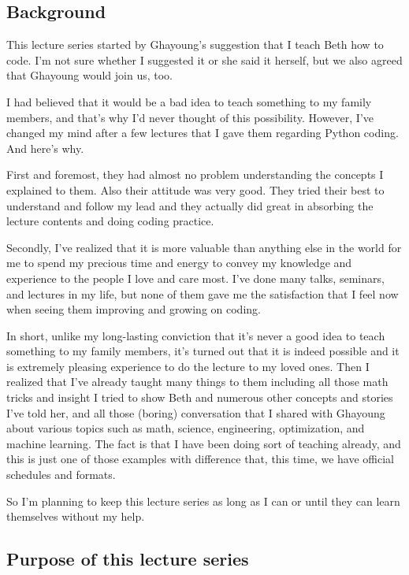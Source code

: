 \documentclass{article}
\begin{document}
\subsection{Background}

This lecture series started by Ghayoung's suggestion that I teach Beth how to code.
I'm not sure whether I suggested it or she said it herself, 
but we also agreed that Ghayoung would join us, too.

I had believed that it would be a bad idea to teach something to my family members,
and that's why I'd never thought of this possibility.
However, I've changed my mind after a few lectures that I gave them regarding Python coding.
And here's why.

First and foremost, they had almost no problem understanding the concepts I explained to them.
Also their attitude was very good. They tried their best to understand and follow my lead
and they actually did great in absorbing the lecture contents and doing coding practice.

Secondly, I've realized that it is more valuable than anything else in the world for me to
spend my precious time and energy to convey my knowledge and experience to the people I love and care most.
I've done many talks, seminars, and lectures in my life, but none of them gave me the satisfaction
that I feel now when seeing them improving and growing on coding.

In short, unlike my long-lasting conviction that it's never a good idea to teach something to my family members,
it's turned out that it is indeed possible and it is extremely pleasing experience to do the lecture to my loved ones.
Then I realized that I've already taught many things to them including
all those math tricks and insight I tried to show Beth and numerous other concepts and stories I've told her, 
and all those (boring) conversation that I shared with Ghayoung about various topics
such as math, science, engineering, optimization, and machine learning.
The fact is that I have been doing sort of teaching already, and this is just one of those examples
with difference that, this time, we have official schedules and formats.

So I'm planning to keep this lecture series as long as I can or until they can learn themselves without my help.


\subsection{Purpose of this lecture series}
\end{document}
